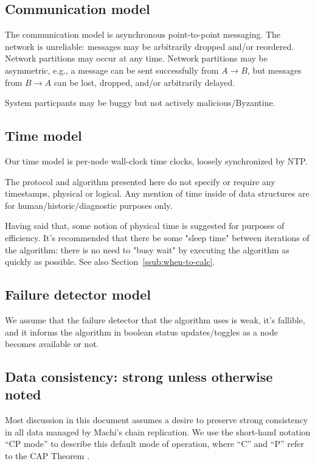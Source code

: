 \documentclass[preprint,10pt]{sigplanconf}
\begin{document}
\subsection{Communication model}

The communication model is asynchronous point-to-point messaging.
The network is unreliable: messages may be arbitrarily dropped and/or
reordered.  Network partitions may occur at any time.
Network partitions may be asymmetric, e.g., a message can be sent successfully
from $A \rightarrow B$, but messages from $B \rightarrow A$ can be
lost, dropped, and/or arbitrarily delayed.

System particpants may be buggy but not actively malicious/Byzantine.

\subsection{Time model}
\label{sub:time-model}

Our time model is per-node wall-clock time clocks, loosely
synchronized by NTP.

The protocol and algorithm presented here do not specify or require any
timestamps, physical or logical.  Any mention of time inside of data
structures are for human/historic/diagnostic purposes only.

Having said that, some notion of physical time is suggested for
purposes of efficiency.  It's recommended that there be some "sleep
time" between iterations of the algorithm: there is no need to "busy
wait" by executing the algorithm as quickly as possible.  See also
Section~\ref{ssub:when-to-calc}.

\subsection{Failure detector model}

We assume that the failure detector that the algorithm uses is weak,
it's fallible, and it informs the algorithm in boolean status
updates/toggles as a node becomes available or not.

\subsection{Data consistency: strong unless otherwise noted}

Most discussion in this document assumes a desire to preserve strong
consistency in all data managed by Machi's chain replication.  We
use the short-hand notation ``CP mode'' to describe this default mode
of operation, where ``C'' and ``P'' refer to the CAP Theorem
\cite{cap-theorem}.
\end{document}
